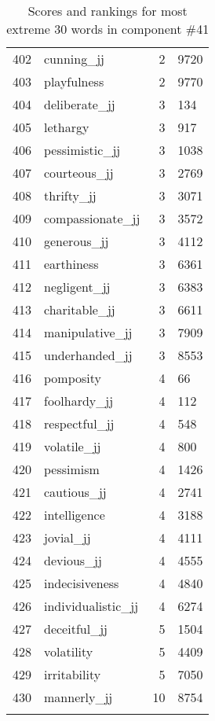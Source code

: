 \begin{longtable}[!htbp]{| rlr@{.}l |}
    402 & cunning\_jj & 2 & 9720 \\
    403 & playfulness & 2 & 9770 \\
    404 & deliberate\_jj & 3 & 134 \\
    405 & lethargy & 3 & 917 \\
    406 & pessimistic\_jj & 3 & 1038 \\
    407 & courteous\_jj & 3 & 2769 \\
    408 & thrifty\_jj & 3 & 3071 \\
    409 & compassionate\_jj & 3 & 3572 \\
    410 & generous\_jj & 3 & 4112 \\
    411 & earthiness & 3 & 6361 \\
    412 & negligent\_jj & 3 & 6383 \\
    413 & charitable\_jj & 3 & 6611 \\
    414 & manipulative\_jj & 3 & 7909 \\
    415 & underhanded\_jj & 3 & 8553 \\
    416 & pomposity & 4 & 66 \\
    417 & foolhardy\_jj & 4 & 112 \\
    418 & respectful\_jj & 4 & 548 \\
    419 & volatile\_jj & 4 & 800 \\
    420 & pessimism & 4 & 1426 \\
    421 & cautious\_jj & 4 & 2741 \\
    422 & intelligence & 4 & 3188 \\
    423 & jovial\_jj & 4 & 4111 \\
    424 & devious\_jj & 4 & 4555 \\
    425 & indecisiveness & 4 & 4840 \\
    426 & individualistic\_jj & 4 & 6274 \\
    427 & deceitful\_jj & 5 & 1504 \\
    428 & volatility & 5 & 4409 \\
    429 & irritability & 5 & 7050 \\
    430 & mannerly\_jj & 10 & 8754 \\
    \hline
    \caption{Scores and rankings for most extreme 30 words in component \#41} \\
\end{longtable}
